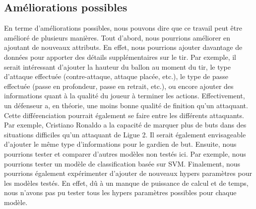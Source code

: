 \documentclass[12pt]{article}
\begin{document}
\subsection{Améliorations possibles}
En terme d'améliorations possibles, nous pouvons dire que ce travail peut être amélioré de plusieurs manières.
Tout d'abord, nous pourrions améliorer en ajoutant de nouveaux attributs.
En effet, nous pourrions ajouter davantage de données pour apporter des détails supplémentaires sur le tir.
Par exemple, il serait intéressant d'ajouter la hauteur du ballon au moment du tir, le type d'attaque effectuée (contre-attaque, attaque placée, etc.), le type de passe effectuée (passe en profondeur, passe en retrait, etc.), ou encore ajouter des informations quant à la qualité du joueur à terminer les actions.
Effectivement, un défenseur a, en théorie, une moins bonne qualité de finition qu'un attaquant. 
Cette différenciation pourrait également se faire entre les différents attaquants. 
Par exemple, Cristiano Ronaldo a la capacité de marquer plus de buts dans des situations difficiles qu'un attaquant de Ligue 2.
Il serait également envisageable d'ajouter le même type d'informations pour le gardien de but.
\newline\newline
Ensuite, nous pourrions tester et comparer d'autres modèles non testés ici.
Par exemple, nous pourrions tester un modèle de classification basée sur SVM.
Finalement, nous pourrions également expérimenter d'ajouter de nouveaux hypers paramètres pour les modèles testés.
En effet, dû à un manque de puissance de calcul et de temps, nous n'avons pas pu tester tous les hypers paramètres possibles pour chaque modèle.
\newpage



\end{document}

